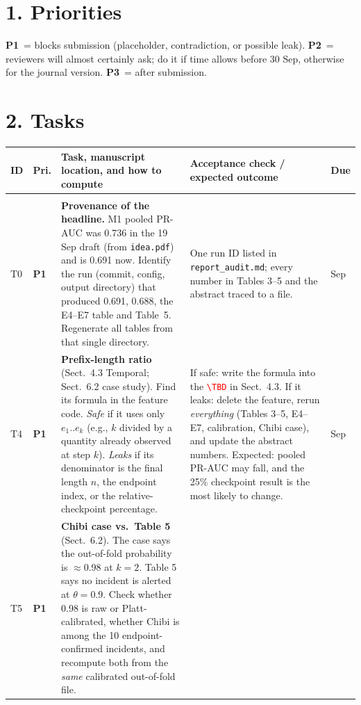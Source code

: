 \documentclass[11pt,a4paper]{article}
\newcommand{\pOne}{\textcolor{red!75!black}{\textbf{P1}}}
\newcommand{\pTwo}{\textcolor{orange!85!black}{\textbf{P2}}}
\newcommand{\pThree}{\textcolor{blue!70!black}{\textbf{P3}}}
\newcommand{\tbd}{\textcolor{red}{\texttt{\textbackslash TBD}}}
\begin{document}
\section*{1. Priorities}
\pOne~= blocks submission (placeholder, contradiction, or possible leak). \pTwo~= reviewers will almost certainly ask; do it if time allows before 30 Sep, otherwise for the journal version. \pThree~= after submission.

\section*{2. Tasks}
{\small
\begin{longtable}{@{}>{\raggedright\arraybackslash}p{0.7cm}>{\raggedright\arraybackslash}p{0.6cm}>{\raggedright\arraybackslash}p{6.9cm}>{\raggedright\arraybackslash}p{5.6cm}>{\raggedright\arraybackslash}p{1.25cm}@{}}
\toprule
ID & Pri. & Task, manuscript location, and how to compute & Acceptance check / expected outcome & Due \\
\midrule
\endhead
\multicolumn{5}{@{}l}{\textbf{A. Do first: these can invalidate other numbers}}\\
T0 & \pOne & \textbf{Provenance of the headline.} M1 pooled PR-AUC was 0.736 in the 19 Sep draft (from \texttt{idea.pdf}) and is 0.691 now. Identify the run (commit, config, output directory) that produced 0.691, 0.688, the E4--E7 table and Table~5. Regenerate all tables from that single directory. &
One run ID listed in \texttt{report\_audit.md}; every number in Tables 3--5 and the abstract traced to a file. & 28 Sep \\
T4 & \pOne & \textbf{Prefix-length ratio} (Sect.~4.3 Temporal; Sect.~6.2 case study). Find its formula in the feature code. \emph{Safe} if it uses only $e_1..e_k$ (e.g., $k$ divided by a quantity already observed at step $k$). \emph{Leaks} if its denominator is the final length $n$, the endpoint index, or the relative-checkpoint percentage. &
If safe: write the formula into the \tbd{} in Sect.~4.3. If it leaks: delete the feature, rerun \emph{everything} (Tables 3--5, E4--E7, calibration, Chibi case), and update the abstract numbers. Expected: pooled PR-AUC may fall, and the 25\% checkpoint result is the most likely to change. & 28 Sep \\
T5 & \pOne & \textbf{Chibi case vs.\ Table 5} (Sect.~6.2). The case says the out-of-fold probability is $\approx$0.98 at $k=2$. Table 5 says no incident is alerted at $\theta=0.9$. Check whether 0.98 is raw or Platt-calibrated, whether Chibi is among the 10 endpoint-confirmed incidents, and recompute both from the \emph{same} calibrated out-of-fold file. &

\end{longtable}}
\end{document}
